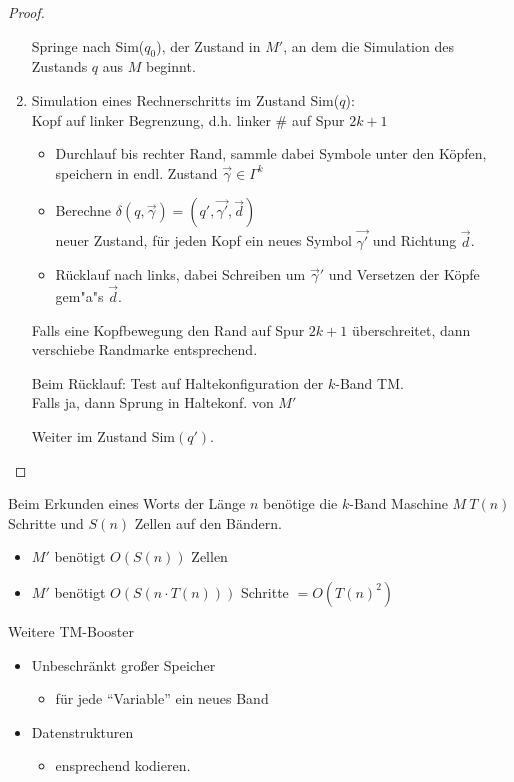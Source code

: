 \begin{proof}
\begin{enumerate}
	Springe nach Sim($q_0$), der Zustand in $M'$, an dem die Simulation des Zustands $q$ aus $M$ beginnt.
	
	\item Simulation eines Rechnerschritts im Zustand Sim($q$):\\
	Kopf auf linker Begrenzung, d.h. linker \# auf Spur $2k+1$
	\begin{itemize}
		\item Durchlauf bis rechter Rand, sammle dabei Symbole unter den Köpfen, speichern in endl. Zustand $\overrightarrow{\gamma} \in \Gamma^k$
		\item Berechne $\delta(q,\overrightarrow{\gamma})=(q',\overrightarrow{\gamma'},\overrightarrow{d})$\\
		neuer Zustand, für jeden Kopf ein neues Symbol $\overrightarrow{\gamma'}$ und Richtung $\overrightarrow{d}$.
		\item Rücklauf nach links, dabei Schreiben um $\overrightarrow{\gamma}'$ und Versetzen der Köpfe gem"a"s $\overrightarrow{d}$.
	\end{itemize}
	Falls eine Kopfbewegung den Rand auf Spur $2k+1$ überschreitet, dann verschiebe Randmarke entsprechend.
	
	Beim Rücklauf: Test auf Haltekonfiguration der $k$-Band \ac{TM}.\\
	Falls ja, dann Sprung in Haltekonf. von $M'$
	
	Weiter im Zustand Sim$(q')$.
	\end{enumerate}
\end{proof}

\begin{Korollar*}
	Beim Erkunden eines Worts der Länge $n$ benötige die $k$-Band Maschine $M\ T(n)$ Schritte und $S(n)$ Zellen auf den Bändern.
	\begin{itemize}
		\item $M'$ benötigt $O(S(n))$ Zellen
		\item $M'$ benötigt $O(S(n\cdot T(n)))$ Schritte $=O(T(n)^2)$
	\end{itemize}
	Weitere \ac{TM}-Booster
	\begin{itemize}
		\item Unbeschränkt großer Speicher
		\begin{itemize}[label=\->]
			\item für jede "`Variable"' ein neues Band
	\end{itemize}
	\item Datenstrukturen
	\begin{itemize}[label={}]
		\item ensprechend kodieren.
	\end{itemize}
	\end{itemize}
\end{Korollar*}

